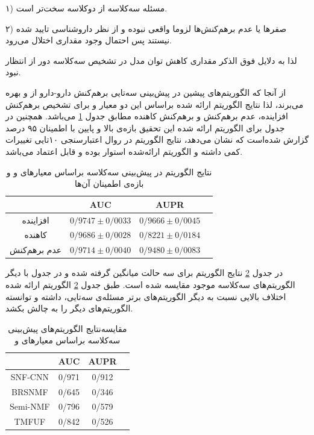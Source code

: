 ۱) مسئله سه‌کلاسه از دوکلاسه سخت‌تر است.

۲) صفرها یا عدم برهم‌کنش‌ها لزوما واقعی نبوده و از نظر داروشناسی تایید شده نیستند پس احتمال وجود مقداری اختلال می‌رود.

لذا به دلایل فوق الذکر مقداری کاهش توان مدل در تشخیص سه‌کلاسه دور از انتظار نبود.

از آنجا که الگوریتم‌های پیشین در پیش‌بینی سه‌تایی برهم‌کنش دارو-دارو از 
و 
بهره می‌برند، لذا نتایج الگوریتم ارائه ‌شده براساس این دو معیار و برای تشخیص برهم‌کنش افزاینده، عدم برهم‌کنش و برهم‌کنش کاهنده مطابق جدول 
\ref{SNF-CNNresult}
می‌باشد. همچنین در جدول برای الگوریتم ارائه ‌شده این تحقیق بازه‌ی بالا و پایین با اطمینان ۹۵ درصد گزارش شده‌است که نشان می‌دهد، نتایج الگوریتم در روال اعتبارسنجی ۱۰تایی تغییرات کمی داشته و الگوریتم ارائه‌شده استوار بوده و قابل اعتماد می‌باشد.

\begin{table}[h!]
\centering 
\begin{tabular}{|c|c|c|c|}
\hline
& AUC	 & AUPR
\\
\hline
افزاینده	& $0/9747 \pm 0/0033$ & $0/9666 \pm 0/0045$
\\
\hline
کاهنده  & $0/9686 \pm 0/0028$ & $0/8221 \pm 0/0184$
\\
\hline
عدم برهم‌کنش & $0/9714 \pm 0/0040$ & $0/9480 \pm 0/0083$
\\\hline
 \end{tabular}
	\caption{
نتایج الگوریتم
 در پیش‌بینی سه‌کلاسه براساس معیارهای 
و 
و بازه‌ی اطمینان آن‌ها
}
	\label{SNF-CNNresult}
\end{table}


در جدول 
\ref{AUCAUPR}
نتایج الگوریتم
برای سه حالت میانگین گرفته ‌شده و در جدول با دیگر الگوریتم‌های سه‌کلاسه موجود مقایسه ‌شده ‌است. طبق جدول 
\ref{AUCAUPR}
الگوریتم ارائه ‌شده اختلاف بالایی نسبت به دیگر الگوریتم‌های برتر مسئله‌ی سه‌تایی، داشته و توانسته الگوریتم‌های دیگر را به چالش بکشد.

\begin{table}[h!]
\centering 
\begin{tabular}{|c|c|c|c|}
\hline
& AUC	& AUPR 
\\
\hline
SNF-CNN	& 0/971 & 0/912
\\
\hline
\rl{\cite{Shi J2019}} BRSNMF & 0/645 & 0/346
\\
\hline
\rl{\cite{Yu H2018}} Semi-NMF & 0/796 & 0/579
\\
\hline
\rl{\cite{Shi J-Y2018}} TMFUF  & 0/842  & 0/526
 \\\hline
 \end{tabular}
	\caption{
مقایسه‌نتایج الگوریتم‌های پیش‌بینی سه‌کلاسه براساس معیارهای 
و 
}
	\label{AUCAUPR}
\end{table}



